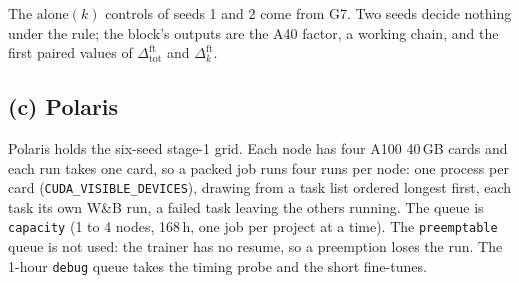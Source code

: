 The $\mathrm{alone}(k)$ controls of seeds 1 and 2 come from G7. Two seeds decide nothing under
the rule; the block's outputs are the A40 factor, a working chain, and the first paired
values of $\Delta^{\mathrm{ft}}_{\mathrm{tot}}$ and $\Delta^{\mathrm{ft}}_{k}$.

\subsection{(c) Polaris}
\label{sec:polaris}

Polaris holds the six-seed stage-1 grid. Each node has four A100 40\,GB cards and each run
takes one card, so a packed job runs four runs per node: one process per card
(\texttt{CUDA\_VISIBLE\_DEVICES}), drawing from a task list ordered longest first, each task its
own W\&B run, a failed task leaving the others running. The queue is \texttt{capacity} (1 to 4
nodes, 168\,h, one job per project at a time). The \texttt{preemptable} queue is not used: the
trainer has no resume, so a preemption loses the run. The 1-hour \texttt{debug} queue takes the
timing probe and the short fine-tunes.

